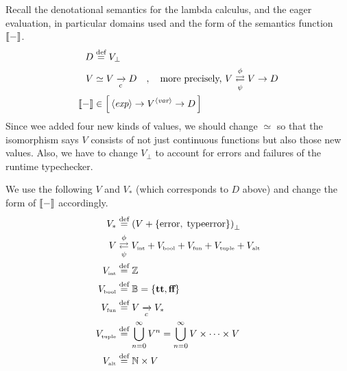 \begin{enumcirc}
	\item
	Recall the denotational semantics for the lambda calculus, and the eager
	evaluation, in particular domains used and the form of the semantics function
	$\left\llbracket - \right\rrbracket$.
	\begin{align*}
		D             & \stackrel{\text{def}}{=} V_\bot                                                                                \\
		V             & \simeq V \xrightarrow[c]{} D \quad , \quad \textrm{more precisely, } V \mathrel{\mathop{\rightleftarrows}^{\mathrm{\phi}}_{\mathrm{\psi}}} V \to D \\
		\left\llbracket - \right\rrbracket & \in \left[ \, \left\langle \textit{exp} \right\rangle \to V^{\left\langle \textit{var} \right\rangle} \to D \, \right]                                           \\
	\end{align*}
	Since wee added four new kinds of values, we should change $\simeq$ so that the
	isomorphism says $V$ consists of not just continuous functions but also those
	new values.
	Also, we have to change $V_\bot$ to account for errors and failures of the
	runtime typechecker.
	\item
	We use the following $V$ and $V_*$ (which corresponds to $D$ above) and change
	the form of $\left\llbracket - \right\rrbracket$ accordingly.
	\begin{align*}
		V_*                  & \defeq \prths{V + \braces{\textrm{error} ,\; \textrm{typeerror}}}_\bot                                                               \\
		V                    & \lrsupsubarrow{\phi}{\psi} \subsctext{V}{int} + \subsctext{V}{bool} + \subsctext{V}{fun} + \subsctext{V}{tuple} + \subsctext{V}{alt} \\
		\subsctext{V}{int}   & \defeq \Z                                                                                                                            \\
		\subsctext{V}{bool}  & \defeq \B = \braces{\ttt, \fff}                                                                                                      \\
		\subsctext{V}{fun}   & \defeq V \toc V_*                                                                                                                    \\
		\subsctext{V}{tuple} & \defeq \bigcup_{n = 0}^\infty V^n = \bigcup_{n = 0}^\infty V \times \dots \times V                                                   \\
		\subsctext{V}{alt}   & \defeq \N \times V                                                                                                                   \\

\end{align*}
\end{enumcirc}
